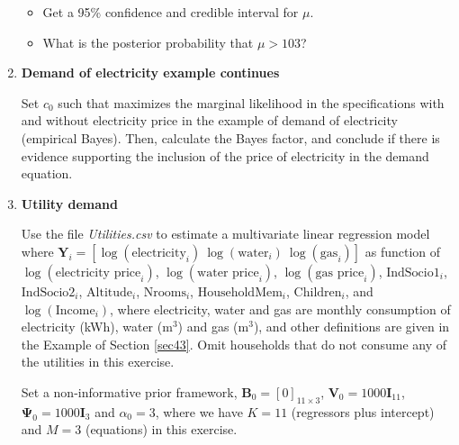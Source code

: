 \begin{enumerate}
\begin{itemize}
	\item Get a 95\% confidence and credible interval for $\mu$.
	\item What is the posterior probability that $\mu > 103$?  
\end{itemize} 


\item \textbf{Demand of electricity example continues}

Set $c_0$ such that maximizes the marginal likelihood in the specifications with and without electricity price in the example of demand of electricity (empirical Bayes). Then, calculate the Bayes factor, and conclude if there is evidence supporting the inclusion of the price of electricity in the demand equation.

\item \textbf{Utility demand}

Use the file \textit{Utilities.csv} to estimate a multivariate linear regression model where $\bm{Y}_i=\left[\log(\text{electricity}_i) \ \log(\text{water}_i) \ \log(\text{gas}_i)\right]$ as function of $\log(\text{electricity price}_i)$, $\log(\text{water price}_i)$, $\log(\text{gas price}_i)$, $\text{IndSocio1}_i$, $\text{IndSocio2}_i$, $\text{Altitude}_i$, $\text{Nrooms}_i$, $\text{HouseholdMem}_i$, $\text{Children}_i$, and $\log(\text{Income}_i)$, where electricity, water and gas are monthly consumption of electricity (kWh), water (m$^3$) and gas (m$^3$), and other definitions are given in the Example of Section \ref{sec43}. Omit households that do not consume any of the utilities in this exercise.  

Set a non-informative prior framework, $\bm{B}_0=\left[0\right]_{11\times 3}$, $\bm{V}_0=1000 \bm{I}_{11}$, $\bm{\Psi}_0=1000 \bm{I}_{3}$ and $\alpha_0=3$, where we have $K=11$ (regressors plus intercept) and $M=3$ (equations) in this exercise.


\end{enumerate}
